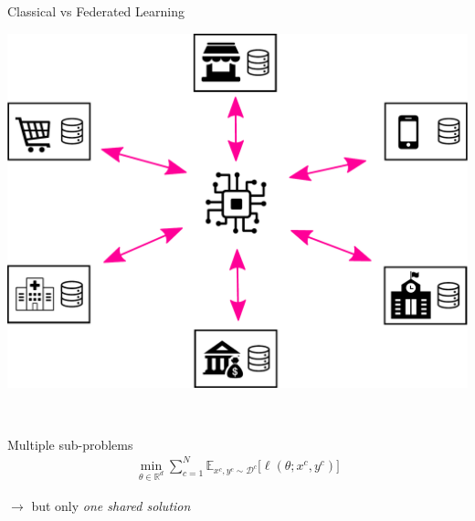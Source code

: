 \documentclass[aspectratio=169,14pt]{beamer}
\begin{document}
\begin{frame}{Classical vs Federated Learning}
  
  \begin{minipage}{0.4\linewidth}
    \begin{center}
      \includegraphics[width=\linewidth]{images/federated-training.pdf}
    \end{center}
    
  \end{minipage}~~~~%
  \begin{minipage}{0.5\linewidth}
    \begin{center}
      Multiple sub-problems
      \begin{align*}
        \min_{\theta \in \mathbb{R}^d} 
        \sum_{c=1}^N \mathbb{E}_{x^c, y^c \sim \mathcal{D}^c} \Big[ \ell( \theta; x^c, y^c ) \Big]
      \end{align*}
      
      $\rightarrow$ but only \emph{one shared solution}
    \end{center}
    
  \end{minipage}


\end{frame}
\end{document}
